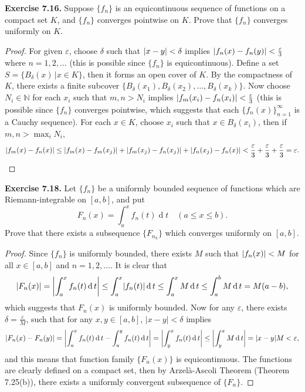 \documentclass[10pt]{article}
\DeclarePairedDelimiter\abs{\lvert}{\rvert}
\begin{document}
\begin{CJK*}{UTF8}{gbsn}
\newpage
\textbf{Exercise 7.16.} Suppose $\{f_n\}$ is an equicontinuous sequence of functions on a compact set $K$, and $\{f_n\}$ converges pointwise on $K$. Prove that $\{f_n\}$ converges uniformly on $K$.
\begin{proof}
For given $\varepsilon$, choose $\delta$ such that $\abs{x-y}<\delta$ implies $\abs{f_n(x)-f_n(y)}<\frac{\varepsilon}{3}$ where $n=1,2,\dots$ (this is possible since $\{f_n\}$ is equicontinuous). Define a set $S=\{B_\delta(x)\,\big|x\in K\}$, then it forms an open cover of $K$. By the compactness of $K$, there exists a finite subcover $\{B_\delta(x_1),B_\delta(x_2),\dots,B_\delta(x_k)\}$. Now choose $N_i\in\mathbb{N}$ for each $x_i$ such that $m,n>N_i$ implies $\abs{f_m(x_i)-f_n(x_i)}<\frac{\varepsilon}{3}$ (this is possible since $\{f_n\}$ converges pointwise, which suggests that each $\{f_n(x)\}_{n=1}^\infty$ is a Cauchy sequence). For each $x\in K$, choose $x_i$ such that $x\in B_\delta(x_i)$, then if $m,n>\max_i N_i$,
$$
\abs{f_m(x)-f_n(x)}\leq\abs{f_m(x)-f_m(x_j)}+\abs{f_m(x_j)-f_n(x_j)}+\abs{f_n(x_j)-f_n(x)}<\frac{\varepsilon}{3}+\frac{\varepsilon}{3}+\frac{\varepsilon}{3}=\varepsilon.
$$
\end{proof}

\textbf{Exercise 7.18.} Let $\{f_n\}$ be a uniformly bounded sequence of functions which are Riemann-integrable on $[a,b]$, and put
$$
F_n(x)=\int_a^xf_n(t)\operatorname{d}t\quad(a\leq x\leq b).
$$
Prove that there exists a subsequence $\{F_{n_k}\}$ which converges uniformly on $[a,b]$.
\begin{proof}
Since $\{f_n\}$ is uniformly bounded, there exists $M$ such that $\abs{f_n(x)}<M$ for all $x\in[a,b]$ and $n=1,2,\dots$. It is clear that
$$
\abs{F_n(x)}=\left|\int_a^xf_n(t)\operatorname{d}t\right|\leq\int_a^x\abs{f_n(t)}\operatorname{d}t\leq\int_a^xM\operatorname{d}t\leq\int_a^bM\operatorname{d}t=M(a-b),
$$
which suggests that $F_n(x)$ is uniformly bounded. Now for any $\varepsilon$, there exists $\delta=\frac{\varepsilon}{M}$, such that for any $x,y\in[a,b]$, $\left|x-y\right|<\delta$ implies
$$
\abs{F_n(x)-F_n(y)}=\left|\int_a^xf_n(t)\operatorname{d}t-\int_a^yf_n(t)\operatorname{d}t\right|=\left|\int_y^xf_n(t)\operatorname{d}t\right|\leq\left|\int_y^xM\operatorname{d}t\right|=\abs{x-y}M<\varepsilon,
$$
and this means that function family $\{F_n(x)\}$ is equicontinuous.
The functions are clearly defined on a compact set, then by Arzel\`a-Ascoli Theorem (Theorem 7.25(b)), there exists a uniformly convergent subsequence of $\{F_n\}$.
\end{proof}


\end{CJK*}
\end{document}
